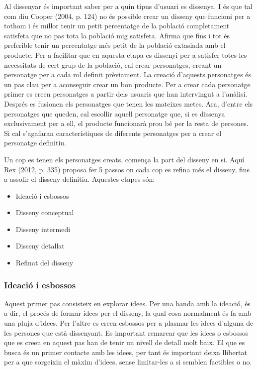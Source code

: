 Al dissenyar és important saber per a quin tipus d'usuari es dissenya. I és que tal com diu Cooper (2004, p. 124) \cite{Cooper} no és possible crear un disseny que funcioni per a tothom i és millor tenir un petit percentatge de la població completament satisfeta que no pas tota la població mig satisfeta. Afirma que fins i tot és preferible tenir un percentatge més petit de la població extasiada amb el producte. Per a facilitar que en aquesta etapa es dissenyi per a satisfer totes les necessitats de cert grup de la població, cal crear personatges, creant un personatge per a cada rol definit prèviament. La creació d'aquests personatges és un pas clau per a aconseguir crear un bon producte. Per a crear cada personatge primer es creen personatges a partir dels usuaris que han intervingut a l'anàlisi. Després es fusionen els personatges que tenen les mateixes metes. Ara, d'entre els personatges que queden, cal escollir aquell personatge que, si es dissenya exclusivament per a ell, el producte funcionarà prou bé per la resta de persones. Si cal s'agafaran característiques de diferents personatges per a crear el personatge definitiu. 

Un cop es tenen els personatges creats, comença la part del disseny en si. Aquí Rex (2012, p. 335) \cite{UX_Book} proposa fer 5 passos on cada cop es refina més el disseny, fins a assolir el disseny definitiu. Aquestes etapes són:

\begin{itemize}
\item Ideació i esbossos
\item Disseny conceptual
\item Disseny intermedi
\item Disseny detallat
\item Refinat del disseny
\end{itemize}


\subsubsection{Ideació i esbossos}
Aquest primer pas consisteix en explorar idees. Per una banda amb la ideació, és a dir, el procés de formar idees per el disseny, la qual cosa normalment és fa amb una pluja d'idees. Per l'altre es creen esbossos per a plasmar les idees d'alguna de les persones que està dissenyant. Es important remarcar que les idees o esbossos que es creen en aquest pas han de tenir un nivell de detall molt baix. El que es busca és un primer contacte amb les idees, per tant és important deixa llibertat per a que sorgeixin el màxim d'idees, sense limitar-les a si semblen factibles o no. 

